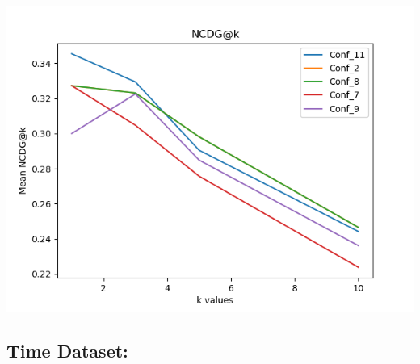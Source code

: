 \documentclass[12pt]{article}
\begin{document}
\begin{center}
\includegraphics[scale=.75]{NCDGk.png}
\end{center}


\subsection{Time Dataset:}
\end{document}
